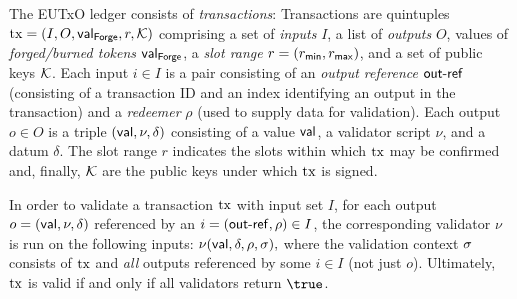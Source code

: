 
The EUTxO ledger consists of \emph{transactions}: Transactions are
quintuples $\mathrm{tx} = (I,O,\mathsf{val}_\mathsf{Forge},r,\mathcal K)$ comprising a set of
\emph{inputs} $I$, a list of \emph{outputs} $O$, values of
\emph{forged/burned tokens} $\mathsf{val}_\mathsf{Forge}$, a \emph{slot range}
\(r = (r_{\mathsf{min}}, r_{\mathsf{max}})\), and a set of public keys $\mathcal K$.
%
Each input \(i\in I\) is a pair consisting of an \emph{output
  reference} $\mathsf{out\textsf{-}{}ref}$ (consisting of a transaction ID and an index
identifying an output in the transaction) and a \emph{redeemer} $\rho$
(used to supply data
for validation).
% 
Each output \(o\in O\)
is %
a triple \((\mathsf{val}, \nu, \delta)\) consisting of a value $\mathsf{val}$, a
validator script $\nu$, and a datum
$\delta$. %
%
The slot range $r$ indicates the slots within which $\mathrm{tx}$ may be
confirmed and, finally, $\mathcal K$ are the public keys under which
$\mathrm{tx}$ is signed.

In order to validate a transaction $\mathrm{tx}$ with input set $I$, for each
output $o = (\mathsf{val},\nu,\delta)$ referenced by an
$i = (\mathsf{out\textsf{-}{}ref},\rho) \in I$, the corresponding validator $\nu$ is run
on the following inputs:
\(
  \nu(\mathsf{val},\delta,\rho,\sigma),
\)
where the validation context $\sigma$ consists of $\mathrm{tx}$ and \emph{all} outputs
referenced by some $i \in I$ (not just $o$).  Ultimately, $\mathrm{tx}$ is
valid if and only if all validators return $\true$.


  

